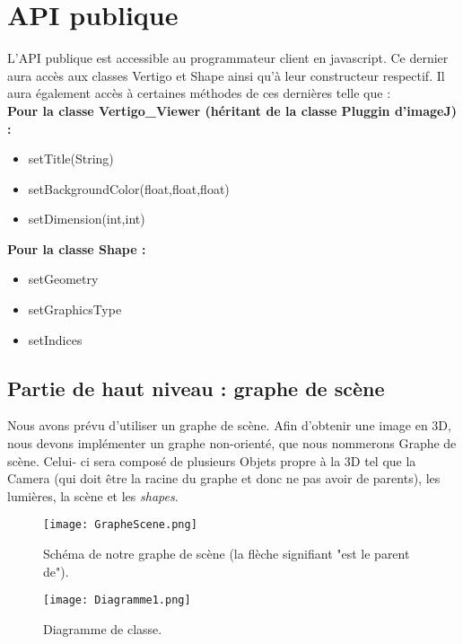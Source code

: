 \documentclass[11pt]{report}
\begin{document}
\section{API publique} 
L'API publique est accessible au programmateur client en javascript.
Ce dernier aura accès aux classes Vertigo et Shape ainsi qu'à leur constructeur respectif.
Il aura également accès à certaines méthodes de ces dernières telle que : 
\\

\textbf{Pour la classe Vertigo\_Viewer (héritant de la classe Pluggin d'imageJ) :}
\begin{itemize}
\item setTitle(String)
\item setBackgroundColor(float,float,float)
\item setDimension(int,int)
\end{itemize}


\textbf{Pour la classe Shape :}
\begin{itemize}
\item setGeometry %
\item setGraphicsType
\item setIndices %
\end{itemize}

\subsection{Partie de haut niveau : graphe de scène}
Nous avons prévu d'utiliser un graphe de scène. 
Afin d'obtenir une image en 3D, nous devons implémenter un graphe non-orienté, que nous nommerons Graphe de scène. Celui- ci sera composé de plusieurs Objets propre à la 3D tel que la Camera (qui doit être la racine du graphe et donc ne pas avoir de parents), les lumières, la scène et les  \textit{shapes}. 

\begin{figure}[h!]
  \caption{Schéma de notre graphe de scène (la flèche signifiant "est le parent de").}
  \centering
    \texttt{[image: GrapheScene.png]} 
    \label{SchemaGrapheSceneSimple}
\end{figure}
 
\begin{figure}[h!]
  \caption{Diagramme de classe.}
  \centering
    \texttt{[image: Diagramme1.png]}
\end{figure}
 
\end{document}
